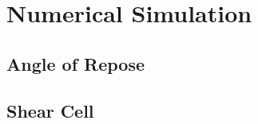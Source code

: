 
\chapter{Numerical Simulation}
\label{cap:numericalsimulation}

\lipsum[1]


\section{Angle of Repose}
\label{sec:aorsim}


\lipsum[1]


\section{Shear Cell}
\label{sec:scsimulation}

\lipsum[1]